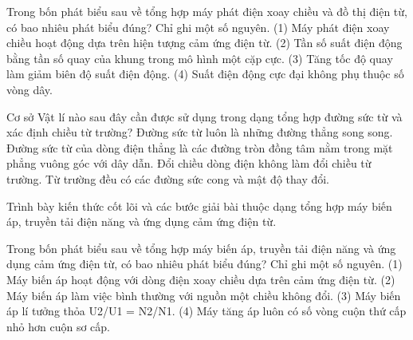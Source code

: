 \begin{ex}
Trong bốn phát biểu sau về tổng hợp máy phát điện xoay chiều và đồ thị điện từ, có bao nhiêu phát biểu đúng? Chỉ ghi một số nguyên. (1) Máy phát điện xoay chiều hoạt động dựa trên hiện tượng cảm ứng điện từ. (2) Tần số suất điện động bằng tần số quay của khung trong mô hình một cặp cực. (3) Tăng tốc độ quay làm giảm biên độ suất điện động. (4) Suất điện động cực đại không phụ thuộc số vòng dây.
\end{ex}

\begin{ex}
Cơ sở Vật lí nào sau đây cần được sử dụng trong dạng tổng hợp đường sức từ và xác định chiều từ trường?
\choice
{Đường sức từ luôn là những đường thẳng song song.}
{\True Đường sức từ của dòng điện thẳng là các đường tròn đồng tâm nằm trong mặt phẳng vuông góc với dây dẫn.}
{Đổi chiều dòng điện không làm đổi chiều từ trường.}
{Từ trường đều có các đường sức cong và mật độ thay đổi.}
\end{ex}

\begin{bt}
Trình bày kiến thức cốt lõi và các bước giải bài thuộc dạng tổng hợp máy biến áp, truyền tải điện năng và ứng dụng cảm ứng điện từ.
\end{bt}

\begin{ex}
Trong bốn phát biểu sau về tổng hợp máy biến áp, truyền tải điện năng và ứng dụng cảm ứng điện từ, có bao nhiêu phát biểu đúng? Chỉ ghi một số nguyên. (1) Máy biến áp hoạt động với dòng điện xoay chiều dựa trên cảm ứng điện từ. (2) Máy biến áp làm việc bình thường với nguồn một chiều không đổi. (3) Máy biến áp lí tưởng thỏa U2/U1 = N2/N1. (4) Máy tăng áp luôn có số vòng cuộn thứ cấp nhỏ hơn cuộn sơ cấp.
\end{ex}

